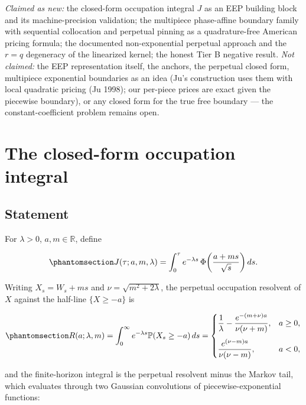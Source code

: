 \documentclass[
  english,
  10pt,
  letterpaper,
  DIV=11,
  numbers=noendperiod]{scrartcl}
\begin{document}
\emph{Claimed as new:} the closed-form occupation integral \(J\) as an
EEP building block and its machine-precision validation; the multipiece
phase-affine boundary family with sequential collocation and perpetual
pinning as a quadrature-free American pricing formula; the documented
non-exponential perpetual approach and the \(r=q\) degeneracy of the
linearized kernel; the honest Tier B negative result. \emph{Not
claimed:} the EEP representation itself, the anchors, the perpetual
closed form, multipiece exponential boundaries as an idea (Ju's
construction uses them with local quadratic pricing (Ju 1998); our
per-piece prices are exact given the piecewise boundary), or any closed
form for the true free boundary --- the constant-coefficient problem
remains open.

\section{The closed-form occupation integral}\label{sec-resolvent}

\subsection{Statement}\label{statement}

For \(\lambda>0\), \(a,m\in\mathbb R\), define

\begin{equation}\protect\phantomsection\label{eq-J}{
J(\tau;a,m,\lambda)=\int_0^\tau e^{-\lambda s}\,
\Phi\!\left(\frac{a+ms}{\sqrt s}\right)ds .
}\end{equation}

Writing \(X_s=W_s+ms\) and \(\nu=\sqrt{m^2+2\lambda}\), the perpetual
occupation resolvent of \(X\) against the half-line \(\{X\ge-a\}\) is

\begin{equation}\protect\phantomsection\label{eq-resolvent}{
R(a;\lambda,m)=\int_0^\infty e^{-\lambda s}\mathbb P(X_s\ge-a)\,ds
=
\begin{cases}
\dfrac1\lambda-\dfrac{e^{-(m+\nu)a}}{\nu(\nu+m)}, & a\ge0,\\[1.2em]
\dfrac{e^{(\nu-m)a}}{\nu(\nu-m)}, & a<0,
\end{cases}
}\end{equation}

and the finite-horizon integral is the perpetual resolvent minus the
Markov tail, which evaluates through two Gaussian convolutions of
piecewise-exponential functions:
\end{document}
